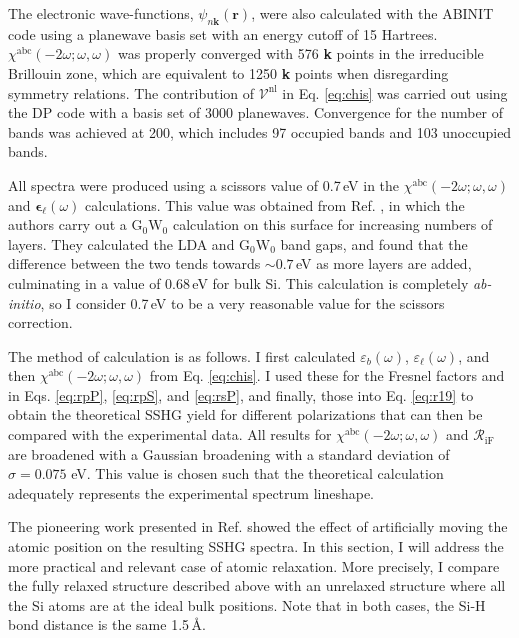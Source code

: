 The electronic wave-functions, $\psi_{n\mathbf{k}}(\mathbf{r})$, were also
calculated with the ABINIT code using a planewave basis set with an energy
cutoff of 15 Hartrees. $\chi^{\mathrm{abc}}(-2\omega;\omega,\omega)$ was
properly converged with 576 \textbf{k} points in the irreducible Brillouin zone,
which are equivalent to 1250 \textbf{k} points when disregarding symmetry
relations. The contribution of $\boldsymbol{\mathcal{V}}^\mathrm{nl}$ in Eq.
\eqref{eq:chis} was carried out using the DP\cite{olevanoDP} code with a basis
set of 3000 planewaves. Convergence for the number of bands was achieved at 200,
which includes 97 occupied bands and 103 unoccupied bands.

All spectra were produced using a scissors value of 0.7\,eV in the
$\chi^{\mathrm{abc}}(-2\omega;\omega,\omega)$ and
$\boldsymbol{\epsilon}_{\ell}(\omega)$ calculations. This value was obtained
from Ref. \cite{liPRB10}, in which the authors carry out a
$\mathrm{G}_{0}\mathrm{W}_{0}$ calculation on this surface for increasing
numbers of layers. They calculated the LDA and $\mathrm{G}_{0}\mathrm{W}_{0}$
band gaps, and found that the difference between the two tends towards
$\sim0.7$\,eV as more layers are added, culminating in a value of 0.68\,eV for
bulk Si. This calculation is completely \emph{ab-initio}, so I consider 0.7\,eV
to be a very reasonable value for the scissors correction.

The method of calculation is as follows. I first calculated
$\varepsilon_{b}(\omega)$, $\varepsilon_{\ell}(\omega)$, and then
$\chi^{\mathrm{abc}}(-2\omega;\omega,\omega)$ from Eq. \eqref{eq:chis}. I used
these for the Fresnel factors and in Eqs. \eqref{eq:rpP}, \eqref{eq:rpS}, and
\eqref{eq:rsP}, and finally, those into Eq. \eqref{eq:r19} to obtain the
theoretical SSHG yield for different polarizations that can then be compared
with the experimental data. All results for
$\chi^{\mathrm{abc}}(-2\omega;\omega,\omega)$ and ${\mathcal R_{\mathrm{iF}}}$
are broadened with a Gaussian broadening with a standard deviation of
$\sigma=0.075$ eV. This value is chosen such that the theoretical calculation
adequately represents the experimental spectrum lineshape.

The pioneering work presented in Ref. \cite{mejiaPRB02} showed the effect of
artificially moving the atomic position on the resulting SSHG spectra. In this
section, I will address the more practical and relevant case of atomic
relaxation. More precisely, I compare the fully relaxed structure described
above with an unrelaxed structure where all the Si atoms are at the ideal bulk
positions. Note that in both cases, the Si-H bond distance is the same 1.5\,\AA.


